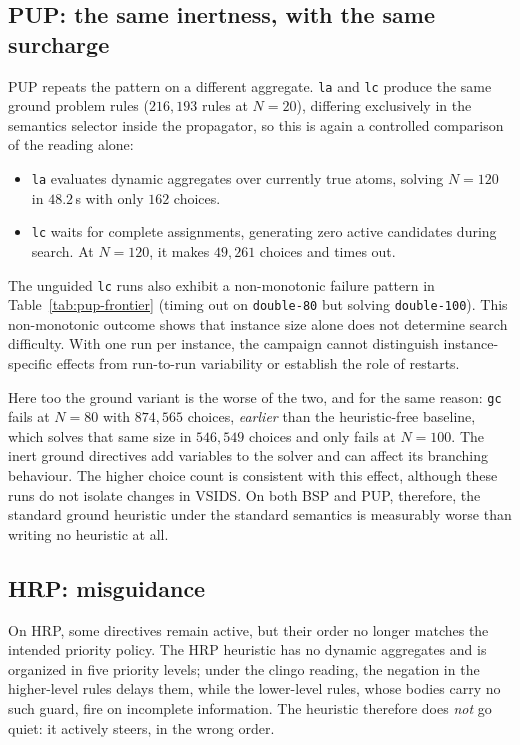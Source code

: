 \subsection{PUP: the same inertness, with the same surcharge}

PUP repeats the pattern on a different aggregate. \texttt{la} and \texttt{lc} produce the same ground problem rules ($216{,}193$ rules at $N=20$), differing exclusively in the semantics selector inside the propagator, so this is again a controlled comparison of the reading alone:
\begin{itemize}
    \item \texttt{la} evaluates dynamic aggregates over currently true atoms, solving $N=120$ in $48.2$\,s with only $162$ choices.
    \item \texttt{lc} waits for complete assignments, generating zero active candidates during search. At $N=120$, it makes $49{,}261$ choices and times out.
\end{itemize}
The unguided \texttt{lc} runs also exhibit a non-monotonic failure pattern in Table~\ref{tab:pup-frontier} (timing out on \texttt{double-80} but solving \texttt{double-100}). This non-monotonic outcome shows that instance size alone does not determine search difficulty. With one run per instance, the campaign cannot distinguish instance-specific effects from run-to-run variability or establish the role of restarts.

Here too the ground variant is the worse of the two, and for the same reason: \texttt{gc} fails at $N=80$ with $874{,}565$ choices, \emph{earlier} than the heuristic-free baseline, which solves that same size in $546{,}549$ choices and only fails at $N=100$. The inert ground directives add variables to the solver and can affect its branching behaviour. The higher choice count is consistent with this effect, although these runs do not isolate changes in VSIDS. On both BSP and PUP, therefore, the standard ground heuristic under the standard semantics is measurably worse than writing no heuristic at all.

\subsection{HRP: misguidance}

On HRP, some directives remain active, but their order no longer matches the intended priority policy. The HRP heuristic has no dynamic aggregates and is organized in five priority levels; under the clingo reading, the negation in the higher-level rules delays them, while the lower-level rules, whose bodies carry no such guard, fire on incomplete information. The heuristic therefore does \emph{not} go quiet: it actively steers, in the wrong order.

